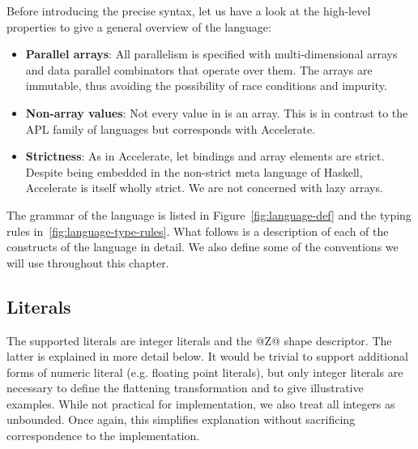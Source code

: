 Before introducing the precise syntax, let us have a look at the high-level properties to give a general overview of the language:
%
\begin{itemize}
\item \textbf{Parallel arrays}: All parallelism is specified with multi-dimensional arrays and data parallel combinators that operate over them. The arrays are immutable, thus avoiding the possibility of race conditions and impurity.
\item \textbf{Non-array values}: Not every value in \ndp{} is an array. This is in contrast to the APL family of languages\cite{Iverson:APL} but corresponds with Accelerate.
\item \textbf{Strictness}: As in Accelerate, let bindings and array elements are strict. Despite being embedded in the non-strict meta language of Haskell, Accelerate is itself wholly strict. We are not concerned with lazy arrays.
\end{itemize}
%
The grammar of the language is listed in Figure~\ref{fig:language-def} and the typing rules in~\ref{fig:language-type-rules}. What follows is a description of each of the constructs of the language in detail. We also define some of the conventions we will use throughout this chapter.

\subsection{Literals}

The supported literals are integer literals and the @Z@ shape descriptor. The latter is explained in more detail below. It would be trivial to support additional forms of numeric literal (e.g. floating point literals), but only integer literals are necessary to define the flattening transformation and to give illustrative examples. While not practical for implementation, we also treat all integers as unbounded. Once again, this simplifies explanation without sacrificing correspondence to the implementation.

